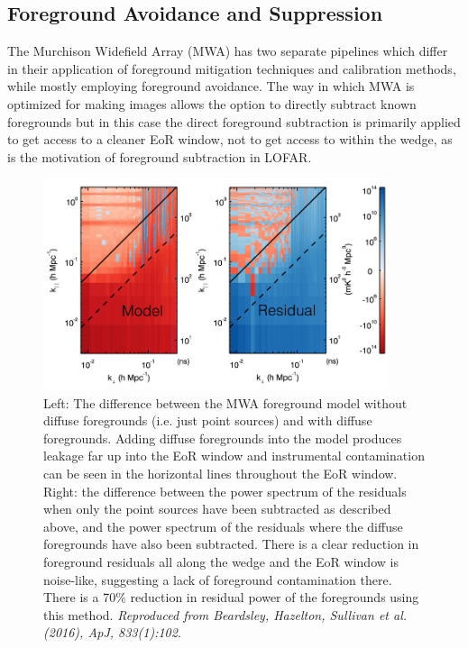 \subsection{Foreground Avoidance and Suppression}

The Murchison Widefield Array (MWA) has two separate pipelines which differ in their application of foreground mitigation techniques and calibration methods, while mostly employing foreground avoidance. The way in which MWA is optimized for making images allows the option to directly subtract known foregrounds but in this case the direct foreground subtraction is primarily applied to get access to a cleaner EoR window, not to get access to within the wedge, as is the motivation of foreground subtraction in LOFAR.

\begin{figure}
\begin{center}
    \includegraphics[width=0.9\textwidth]{Chapman_Jelic/Images/apjaa3b64f9_hr.png}
\end{center}
\caption{Left: The difference between the MWA foreground model without diffuse foregrounds (i.e. just point sources) and with diffuse foregrounds. Adding diffuse foregrounds into the model produces leakage far up into the EoR window and instrumental contamination can be seen in the horizontal lines throughout the EoR window. Right: the difference between the power spectrum of the residuals when only the point sources have been subtracted as described above, and the power spectrum of the residuals where the diffuse foregrounds have also been subtracted. There is a clear reduction in foreground residuals all along the wedge and the EoR window is noise-like, suggesting a lack of foreground contamination there. There is a 70$\%$ reduction in residual power of the foregrounds using this method. \textit{Reproduced from Beardsley, Hazelton, Sullivan et al. (2016), ApJ, 833(1):102}.}
    \label{fig:beardsley_fg_sub}
\end{figure}


